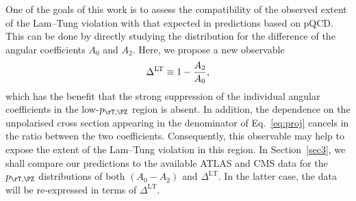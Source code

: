 One of the goals of this work is to assess the compatibility of the observed extent of the Lam--Tung violation
with that expected in predictions based on pQCD. This can be done by directly studying the \ptz distribution for 
the difference of the angular coefficients $A_0$ and $A_2$. Here, we propose a new observable
%
\begin{align} \label{eq:dLT}
  \Delta^{\rm LT} \equiv 1 - \frac{A_2}{A_0} ,
\end{align}
%
which has the benefit that the strong suppression of the individual angular coefficients
in the low-$\ptz$ region is absent.
In addition, the dependence on the unpolarised cross section appearing in the denominator of Eq.~\eqref{eq:proj} cancels in the ratio between the two coefficients.
Consequently, this observable may help to expose the extent of the Lam--Tung
violation in this region.
% 
In Section~\ref{sec3}, we shall compare our predictions to the available ATLAS and CMS data for the
$\ptz$ distributions of both $(A_0-A_2)$ and $\Delta^\mathrm{LT}$. In the latter case, 
the data will be re-expressed in terms of $\Delta^\mathrm{LT}$.
